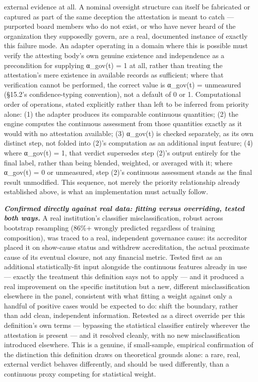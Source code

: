 \documentclass[
]{article}
\begin{document}
external evidence at all. A nominal oversight structure can itself be
fabricated or captured as part of the same deception the attestation is
meant to catch --- purported board members who do not exist, or who have
never heard of the organization they supposedly govern, are a real,
documented instance of exactly this failure mode. An adapter operating
in a domain where this is possible must verify the attesting body's own
genuine existence and independence as a precondition for supplying
α\_gov(t) = 1 at all, rather than treating the attestation's mere
existence in available records as sufficient; where that verification
cannot be performed, the correct value is α\_gov(t) = unmeasured
(§15.2's confidence-typing convention), not a default of 0 or 1.
Computational order of operations, stated explicitly rather than left to
be inferred from priority alone: (1) the adapter produces its comparable
continuous quantities; (2) the engine computes the continuous assessment
from those quantities exactly as it would with no attestation available;
(3) α\_gov(t) is checked separately, as its own distinct step, not
folded into (2)'s computation as an additional input feature; (4) where
α\_gov(t) = 1, that verdict supersedes step (2)'s output entirely for
the final label, rather than being blended, weighted, or averaged with
it; where α\_gov(t) = 0 or unmeasured, step (2)'s continuous assessment
stands as the final result unmodified. This sequence, not merely the
priority relationship already established above, is what an
implementation must actually follow.

\emph{\textbf{Confirmed directly against real data: fitting versus
overriding, tested both ways.}} A real institution's classifier
misclassification, robust across bootstrap resampling (86\%+ wrongly
predicted regardless of training composition), was traced to a real,
independent governance cause: its accreditor placed it on show-cause
status and withdrew accreditation, the actual proximate cause of its
eventual closure, not any financial metric. Tested first as an
additional statistically-fit input alongside the continuous features
already in use --- exactly the treatment this definition says not to
apply --- and it produced a real improvement on the specific institution
but a new, different misclassification elsewhere in the panel,
consistent with what fitting a weight against only a handful of positive
cases would be expected to do: shift the boundary, rather than add
clean, independent information. Retested as a direct override per this
definition's own terms --- bypassing the statistical classifier entirely
wherever the attestation is present --- and it resolved cleanly, with no
new misclassification introduced elsewhere. This is a genuine, if
small-sample, empirical confirmation of the distinction this definition
draws on theoretical grounds alone: a rare, real, external verdict
behaves differently, and should be used differently, than a continuous
proxy competing for statistical weight.
\end{document}
